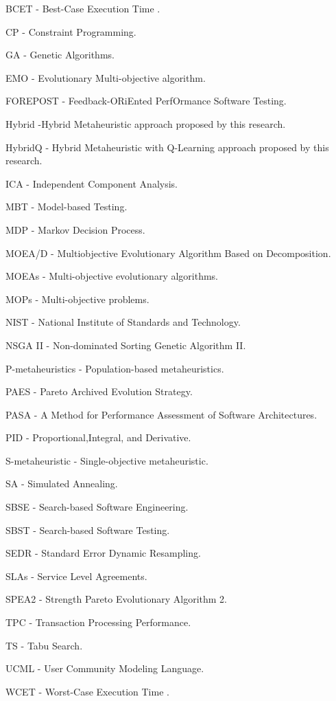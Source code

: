 
\begin{description}
 \item BCET - Best-Case Execution Time .
 \item CP - Constraint Programming.
 \item GA - Genetic Algorithms.
 \item EMO - Evolutionary Multi-objective algorithm.
 \item FOREPOST - Feedback-ORiEnted PerfOrmance Software Testing.
 \item Hybrid -Hybrid Metaheuristic approach proposed by this research.
 \item HybridQ - Hybrid Metaheuristic with Q-Learning approach proposed by this research.
 \item ICA - Independent Component Analysis.
 \item MBT - Model-based Testing.
 \item MDP - Markov Decision Process.
 \item MOEA/D - Multiobjective Evolutionary Algorithm Based on Decomposition.
 \item MOEAs - Multi-objective evolutionary algorithms. 
 \item MOPs - Multi-objective problems. 
 \item NIST -  National Institute of Standards and Technology. 
 \item NSGA II - Non-dominated Sorting Genetic Algorithm II.
 \item P-metaheuristics - Population-based metaheuristics.
 \item PAES - Pareto Archived Evolution Strategy.
 \item PASA - A Method for Performance Assessment of Software Architectures.
 \item PID - Proportional,Integral, and Derivative.
 \item S-metaheuristic -  Single-objective metaheuristic.
 \item SA - Simulated Annealing.
 \item SBSE - Search-based Software Engineering.
 \item SBST - Search-based Software Testing. 
 \item SEDR - Standard Error Dynamic Resampling.
 \item SLAs - Service Level Agreements.
 \item SPEA2 - Strength Pareto Evolutionary Algorithm 2.
 \item TPC - Transaction Processing Performance.
 \item TS - Tabu Search.
 \item UCML -  User Community Modeling Language.
 \item WCET - Worst-Case Execution Time .

 
\end{description}
